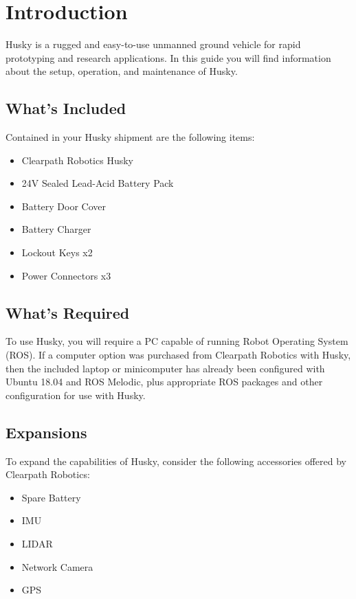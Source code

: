 \documentclass[]{clearpath-latex/clearpath-manual}
\begin{document}
\tableofcontents

\section{Introduction}

Husky is a rugged and easy-to-use unmanned ground vehicle for rapid prototyping and research applications. In this guide you will find information about the setup, operation, and maintenance of Husky.

\subsection{What's Included}

Contained in your Husky shipment are the following items:

\begin{itemize}[nolistsep]
  \item Clearpath Robotics Husky
  \item 24V Sealed Lead-Acid Battery Pack
  \item Battery Door Cover
  \item Battery Charger
  \item Lockout Keys x2
  \item Power Connectors x3
\end{itemize}


\subsection{What's Required}

To use Husky, you will require a PC capable of running Robot Operating System (ROS).
If a computer option was purchased from Clearpath Robotics with Husky, then the included laptop or minicomputer has
already been configured with Ubuntu 18.04 and ROS Melodic, plus appropriate ROS packages and other configuration for use with Husky.

\subsection{Expansions}
To expand the capabilities of Husky, consider the following accessories offered by Clearpath Robotics:


\begin{itemize}[nolistsep]
  \item Spare Battery
  \item IMU
  \item LIDAR
  \item Network Camera
  \item GPS
\end{itemize}
\end{document}
